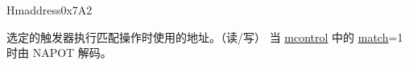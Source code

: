 \begin{register}{H}{maddress}{0x7A2}\label{regdesc:MADDRESS}
%
\regnewline%
\begin{regdesc}\begin{reglist}
\label{fielddesc:MADDRESS}\item [maddress] 选定的触发器执行匹配操作时使用的地址。（读/写） \newline 当 \hyperref[regdesc:MCONTROL]{mcontrol} 中的 \hyperref[fielddesc:MCONTROLMATCH]{match}=1 时由 NAPOT 解码。
\end{reglist}\end{regdesc}
\end{register}
